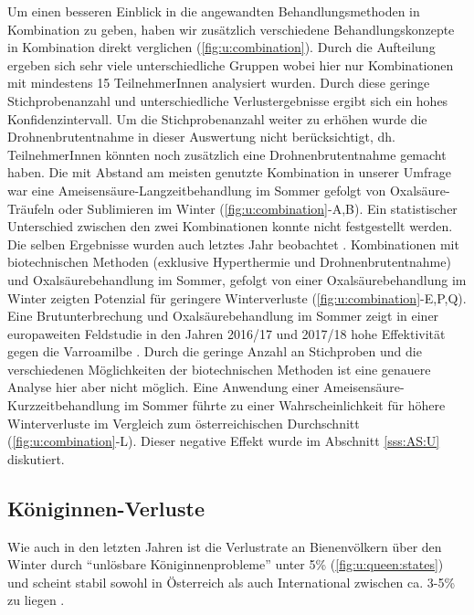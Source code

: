 Um einen besseren Einblick in die angewandten Behandlungsmethoden in Kombination zu geben, haben wir zusätzlich verschiedene Behandlungskonzepte in Kombination direkt verglichen (\cref{fig:u:combination}). Durch die Aufteilung ergeben sich sehr viele unterschiedliche Gruppen wobei hier nur Kombinationen mit mindestens 15 TeilnehmerInnen analysiert wurden. Durch diese geringe Stichprobenanzahl und unterschiedliche Verlustergebnisse ergibt sich ein hohes Konfidenzintervall. Um die Stichprobenanzahl weiter zu erhöhen wurde die Drohnenbrutentnahme in dieser Auswertung nicht berücksichtigt, dh. TeilnehmerInnen könnten noch zusätzlich eine Drohnenbrutentnahme gemacht haben.
\newline
Die mit Abstand am meisten genutzte Kombination in unserer Umfrage war eine Ameisensäure-Langzeitbehandlung im Sommer gefolgt von Oxalsäure-Träufeln oder Sublimieren im Winter (\cref{fig:u:combination}-A,B). Ein statistischer Unterschied zwischen den zwei Kombinationen konnte nicht festgestellt werden. Die selben Ergebnisse wurden auch letztes Jahr beobachtet \citep{oberreiter2020}.
\newline
Kombinationen mit biotechnischen Methoden (exklusive Hyperthermie und Drohnenbrutentnahme) und Oxalsäurebehandlung im Sommer, gefolgt von einer Oxalsäurebehandlung im Winter zeigten Potenzial für geringere Winterverluste (\cref{fig:u:combination}-E,P,Q). Eine Brutunterbrechung und Oxalsäurebehandlung im Sommer zeigt in einer europaweiten Feldstudie in den Jahren 2016/17 und 2017/18 hohe Effektivität gegen die Varroamilbe \citep{buchler2020}. Durch die geringe Anzahl an Stichproben und die verschiedenen Möglichkeiten der biotechnischen Methoden ist eine genauere Analyse hier aber nicht möglich. 
\newline
Eine Anwendung einer Ameisensäure-Kurzzeitbehandlung im Sommer führte zu einer Wahrscheinlichkeit für höhere Winterverluste im Vergleich zum österreichischen Durchschnitt (\cref{fig:u:combination}-L). Dieser negative Effekt wurde im Abschnitt \ref{sss:AS:U}  diskutiert.

\subsection{Königinnen-Verluste}

Wie auch in den letzten Jahren ist die Verlustrate an Bienenvölkern über den Winter durch \enquote{unlösbare Königinnenprobleme} unter 5\% (\cref{fig:u:queen:states}) und scheint stabil sowohl in Österreich als auch International zwischen ca. 3-5\% zu liegen \citep{brodschneider2019, gray2019, oberreiter2020, gray2020}.


